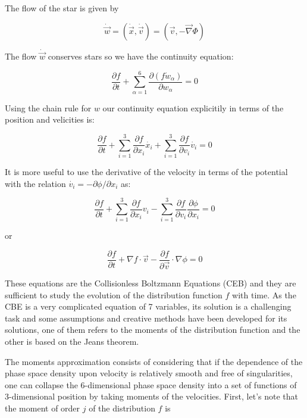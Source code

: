 The flow of the star is given by 

\begin{equation}
\dot{\vec{w}}= (\dot{\vec{x}},\dot{\vec{v}})=(\vec{v},-\vec{\nabla} \Phi)
\end{equation}

The flow $\dot{\vec{w}}$ conserves stars so we have the continuity equation:

\begin{equation}
\frac{\partial f}{\partial t}+\sum_{\alpha=1}^{6}\frac{\partial (f\dot{w}_{\alpha})}{\partial w_{\alpha}}=0
\end{equation}

Using the chain rule for $w$ our continuity equation explicitily in terms of the position and velicities is:

\begin{equation}
\frac{\partial f}{\partial t}+\sum_{i=1}^{3}\frac{\partial f}{\partial x_{i}}\dot{x_{i}}+\sum_{i=1}^{3}\frac{\partial f}{\partial v_{i}}\dot{v_{i}}=0
\end{equation}

It is more useful to use the derivative of the velocity in terms of the potential with the relation $\dot{v_{i}}=-\partial\phi / \partial x_{i}$ as:

\begin{equation}
\frac{\partial f}{\partial t}+\sum_{i=1}^{3}\frac{\partial f}{\partial x_{i}}v_{i}-\sum_{i=1}^{3}\frac{\partial f}{\partial v_{i}}\frac{\partial\phi}{\partial x_{i}}=0
\end{equation}

or

\begin{equation}
\frac{\partial f}{\partial t}+\nabla f\cdot\vec{v}-\frac{\partial f}{\partial\overrightarrow{v}}\cdot\nabla\phi=0
\end{equation}

These equations are the Collisionless Boltzmann Equations (CEB) and they are sufficient to study the evolution of the distribution function $f$ with time. As the CBE is a very complicated equation of 7 variables, its solution is a challenging task and some assumptions and creative methods have been developed for its solutions, one of them refers to the moments of the distribution function and the other is based on the Jeans theorem.

The moments approximation consists of considering that if the dependence of the phase space density upon velocity is relatively smooth and free of singularities, one can collapse the 6-dimensional phase space density into a set of functions of 3-dimensional position by taking moments of the velocities. First, let's note that the moment of order $j$ of the distribution $f$ is

